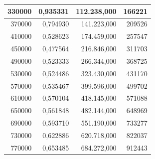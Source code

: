 \documentclass[a4paper, 12pt]{article}
\begin{document}
\begin{longtable}[c]{@{}rrrr@{}}
	\multicolumn{1}{|r|}{330000}                  & \multicolumn{1}{r|}{0,935331}          & \multicolumn{1}{r|}{112.238,000}         & \multicolumn{1}{r|}{166221}            \\* \midrule
	\multicolumn{1}{|r|}{370000}                  & \multicolumn{1}{r|}{0,794930}          & \multicolumn{1}{r|}{141.223,000}         & \multicolumn{1}{r|}{209526}            \\* \midrule
	\multicolumn{1}{|r|}{410000}                  & \multicolumn{1}{r|}{0,528623}          & \multicolumn{1}{r|}{174.459,000}         & \multicolumn{1}{r|}{257547}            \\* \midrule
	\multicolumn{1}{|r|}{450000}                  & \multicolumn{1}{r|}{0,477564}          & \multicolumn{1}{r|}{216.846,000}         & \multicolumn{1}{r|}{311703}            \\* \midrule
	\multicolumn{1}{|r|}{490000}                  & \multicolumn{1}{r|}{0,523333}          & \multicolumn{1}{r|}{266.344,000}         & \multicolumn{1}{r|}{368725}            \\* \midrule
	\multicolumn{1}{|r|}{530000}                  & \multicolumn{1}{r|}{0,524486}          & \multicolumn{1}{r|}{323.430,000}         & \multicolumn{1}{r|}{431170}            \\* \midrule
	\multicolumn{1}{|r|}{570000}                  & \multicolumn{1}{r|}{0,535467}          & \multicolumn{1}{r|}{399.596,000}         & \multicolumn{1}{r|}{499702}            \\* \midrule
	\multicolumn{1}{|r|}{610000}                  & \multicolumn{1}{r|}{0,570104}          & \multicolumn{1}{r|}{418.145,000}         & \multicolumn{1}{r|}{571088}            \\* \midrule
	\multicolumn{1}{|r|}{650000}                  & \multicolumn{1}{r|}{0,561848}          & \multicolumn{1}{r|}{482.144,000}         & \multicolumn{1}{r|}{648969}            \\* \midrule
	\multicolumn{1}{|r|}{690000}                  & \multicolumn{1}{r|}{0,593710}          & \multicolumn{1}{r|}{551.190,000}         & \multicolumn{1}{r|}{733277}            \\* \midrule
	\multicolumn{1}{|r|}{730000}                  & \multicolumn{1}{r|}{0,622886}          & \multicolumn{1}{r|}{620.718,000}         & \multicolumn{1}{r|}{822037}            \\* \midrule
	\multicolumn{1}{|r|}{770000}                  & \multicolumn{1}{r|}{0,653485}          & \multicolumn{1}{r|}{684.272,000}         & \multicolumn{1}{r|}{912443}            \\* \midrule

\end{longtable}
\end{document}
